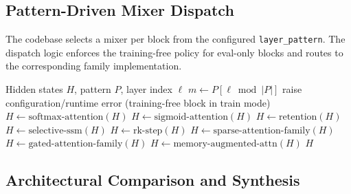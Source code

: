 \subsection{Pattern-Driven Mixer Dispatch}

The codebase selects a mixer per block from the configured \texttt{layer\_pattern}. The dispatch logic enforces the training-free policy for eval-only blocks and routes to the corresponding family implementation.

\begin{algorithm}[t]
\caption{Pattern-Driven Mixer Forward (Conceptual)}
\begin{algorithmic}[1]
\Require Hidden states $H$, pattern $P$, layer index $\ell$
\State $m \gets P[\ell \bmod |P|]$
    \State raise configuration/runtime error (training-free block in train mode)
    \State $H \gets \text{softmax-attention}(H)$
    \State $H \gets \text{sigmoid-attention}(H)$
    \State $H \gets \text{retention}(H)$
    \State $H \gets \text{selective-ssm}(H)$
    \State $H \gets \text{rk-step}(H)$
    \State $H \gets \text{sparse-attention-family}(H)$
    \State $H \gets \text{gated-attention-family}(H)$
\Else
    \State $H \gets \text{memory-augmented-attn}(H)$
\EndIf
\State \Return $H$
\end{algorithmic}
\end{algorithm}

\subsection{Architectural Comparison and Synthesis}

